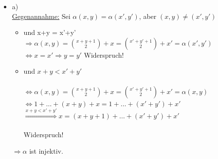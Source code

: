 \documentclass[a4paper]{scrartcl}%
\begin{document}
    \begin{itemize}
        \item a)\\
            \underline{Gegenannahme:} Sei $\alpha(x,y) = \alpha(x',y')$, aber $(x,y) \neq (x',y')$\\
            \begin{itemize}
                \item und x+y = x'+y'\\
                    $\Rightarrow \alpha(x,y) = \binom{x+y+1}{2} + x = \binom{x'+y'+1}{2} + x' = \alpha(x',y')$\\
                    $\Leftrightarrow x = x' \Rightarrow y = y'$ Widerspruch!
                \item und $x+y < x'+y'$\\
                    \\$\Leftrightarrow \alpha(x,y) = \binom{x+y+1}{2} + x = \binom{x'+y'+1}{2} + x' = \alpha(x,y)$\\
                    $\Leftrightarrow 1 + \dots + (x+y) + x = 1 + \dots + (x'+y') + x'$\\
                    $\overset{x+y < x'+y'}{\Rightarrow} x = (x + y + 1) + \dots + (x' + y') + x'$\\
                    \\Widerspruch!\\
            \end{itemize}
            $\Rightarrow \alpha$ ist injektiv.\\
        

\end{itemize}
\end{document}
